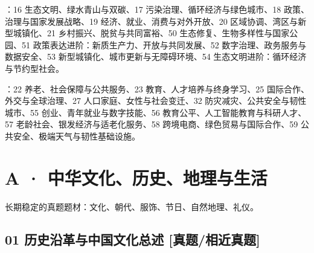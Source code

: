 \documentclass[a4paper,11pt,UTF8,fontset=none]{ctexart}
\begin{document}
：16 生态文明、绿水青山与双碳、17 污染治理、循环经济与绿色城市、18 政策、治理与国家发展战略、19 经济、就业、消费与对外开放、20 区域协调、湾区与新型城镇化、21 乡村振兴、脱贫与共同富裕、50 生态修复、生物多样性与国家公园、51 政策表达进阶：新质生产力、开放与共同发展、52 数字治理、政务服务与数据安全、53 新型城镇化、城市更新与无障碍环境、54 生态文明进阶：循环经济与节约型社会。\par

：22 养老、社会保障与公共服务、23 教育、人才培养与终身学习、25 国际合作、外交与全球治理、27 人口家庭、女性与社会变迁、32 防灾减灾、公共安全与韧性城市、55 创业、青年就业与数字技能、56 教育公平、人工智能教育与科研人才、57 老龄社会、银发经济与适老化服务、58 跨境电商、绿色贸易与国际合作、59 公共安全、极端天气与韧性基础设施。\par

\par\vspace{4pt}{\color{RuleGray}\hrule}\vspace{4pt}

\section{A · 中华文化、历史、地理与生活}

\noindent 长期稳定的真题题材：文化、朝代、服饰、节日、自然地理、礼仪。\par

\subsection{01 历史沿革与中国文化总述 {\color{AccentBlue} [真题/相近真题]}}
\end{document}

